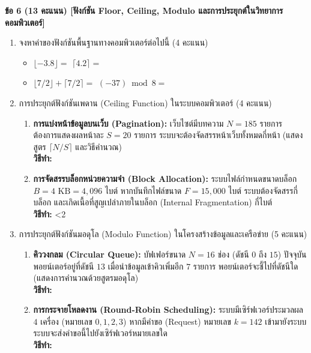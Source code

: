 \documentclass[a4paper,12pt]{article}
\newcounter{examline}
\newcommand{\examlines}[1]{%
  \setcounter{examline}{0}%
  \loop\ifnum\value{examline}<#1\relax
    \par\vspace{0.68em}\noindent\textcolor{gray!40}{\hrulefill}%
    \stepcounter{examline}%
  \repeat
}
\begin{document}
\noindent\textbf{ข้อ 6 (13 คะแนน) [ฟังก์ชัน Floor, Ceiling, Modulo และการประยุกต์ในวิทยาการคอมพิวเตอร์]} \\
\begin{enumerate}[label=6.\arabic*), itemsep=4pt]
  \item จงหาค่าของฟังก์ชันพื้นฐานทางคอมพิวเตอร์ต่อไปนี้ (4 คะแนน)
  \begin{itemize}[leftmargin=1.2cm, itemsep=2.5pt]
    \item $\lfloor -3.8 \rfloor = $ \makebox[3.0cm]{\dotfill} \qquad\qquad $\lceil 4.2 \rceil = $ \makebox[3.0cm]{\dotfill}
    \item $\lfloor 7/2 \rfloor + \lceil 7/2 \rceil = $ \makebox[2.5cm]{\dotfill} \qquad\qquad $(-37) \bmod 8 = $ \makebox[2.5cm]{\dotfill}
  \end{itemize}

  \item การประยุกต์ฟังก์ชันเพดาน (Ceiling Function) ในระบบคอมพิวเตอร์ (4 คะแนน)
  \begin{enumerate}[label=(\alph*), itemsep=3pt]
    \item \textbf{การแบ่งหน้าข้อมูลบนเว็บ (Pagination):} เว็บไซต์มีบทความ $N = 185$ รายการ ต้องการแสดงผลหน้าละ $S = 20$ รายการ ระบบจะต้องจัดสรรหน้าเว็บทั้งหมดกี่หน้า (แสดงสูตร $\lceil N/S \rceil$ และวิธีคำนวณ)\\
    \noindent\textbf{วิธีทำ:} \makebox[13.5cm]{\dotfill}
    \item \textbf{การจัดสรรบล็อกหน่วยความจำ (Block Allocation):} ระบบไฟล์กำหนดขนาดบล็อก $B = 4\text{ KB} = 4{,}096\text{ ไบต์}$ หากบันทึกไฟล์ขนาด $F = 15{,}000\text{ ไบต์}$ ระบบต้องจัดสรรกี่บล็อก และเกิดเนื้อที่สูญเปล่าภายในบล็อก (Internal Fragmentation) กี่ไบต์\\
    \noindent\textbf{วิธีทำ:}
    \examlines{2}
  \end{enumerate}

  \item การประยุกต์ฟังก์ชันมอดุโล (Modulo Function) ในโครงสร้างข้อมูลและเครือข่าย (5 คะแนน)
  \begin{enumerate}[label=(\alph*), itemsep=3pt]
    \item \textbf{คิววงกลม (Circular Queue):} บัฟเฟอร์ขนาด $N = 16$ ช่อง (ดัชนี $0$ ถึง $15$) ปัจจุบันพอยน์เตอร์อยู่ที่ดัชนี $13$ เมื่อนำข้อมูลเข้าคิวเพิ่มอีก $7$ รายการ พอยน์เตอร์จะชี้ไปที่ดัชนีใด (แสดงการคำนวณด้วยสูตรมอดุโล)\\
    \noindent\textbf{วิธีทำ:} \makebox[13.5cm]{\dotfill}
    \item \textbf{การกระจายโหลดงาน (Round-Robin Scheduling):} ระบบมีเซิร์ฟเวอร์ประมวลผล $4$ เครื่อง (หมายเลข $0, 1, 2, 3$) หากมีคำขอ (Request) หมายเลข $k = 142$ เข้ามายังระบบ ระบบจะส่งคำขอนี้ไปยังเซิร์ฟเวอร์หมายเลขใด\\
    \noindent\textbf{วิธีทำ:} \makebox[13.5cm]{\dotfill}
  \end{enumerate}
\end{enumerate}
\end{document}
